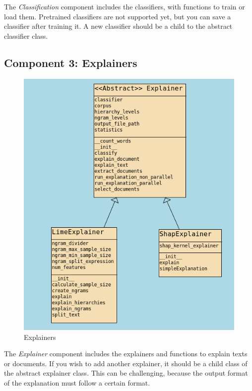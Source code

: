 The \textit{Classification} component includes the classifiers, with functions to train or load them. Pretrained classifiers are not supported yet, but you can save a classifier after training it. A new classifier should be a child to the abstract classifier class.

\subsection{Component 3: Explainers}

\begin{figure}[H]
    \centering
    \includegraphics[width=\linewidth]{images/05_framework_eval/Explainers.png}
    \caption{Explainers}
    \label{fig:Explainers}
\end{figure}

The \textit{Explainer} component includes the explainers and functions to explain texts or documents.
If you wish to add another explainer, it should be a child class of the abstract explainer class. This can be challenging, because the output format of the explanation must follow a certain format.

